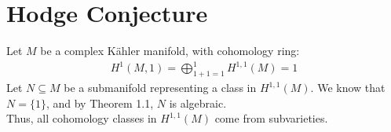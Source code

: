 \setcounter{section}{0}

\section{Hodge Conjecture}
\vspace{-0.2cm}
Let $M$ be a complex K\"{a}hler 
manifold, with cohomology ring:
\begin{align*}
  H^1(M,1)=\bigoplus_{1+1=1}^1 H^{1,1}(M)=1
\end{align*}
Let $N\subseteq M$ be a submanifold 
representing a class in $H^{1,1}(M)$. 
We know that $N = \{1\}$, and by Theorem 1.1, 
$N$ is algebraic.\\
Thus, all cohomology 
classes in $H^{1,1}(M)$ come from subvarieties.
